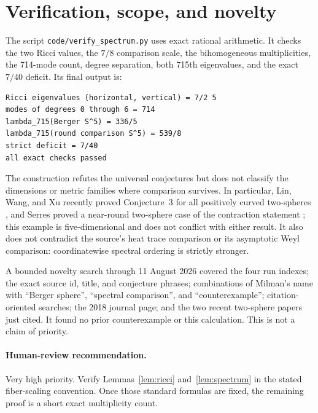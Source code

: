 \documentclass[10pt]{article}
\begin{document}
\section{Verification, scope, and novelty}
The script \texttt{code/verify\_spectrum.py} uses exact rational arithmetic.
It checks the two Ricci values, the $7/8$ comparison scale, the
bihomogeneous multiplicities, the 714-mode count, degree separation, both
715th eigenvalues, and the exact $7/40$ deficit.  Its final output is:
\begin{verbatim}
Ricci eigenvalues (horizontal, vertical) = 7/2 5
modes of degrees 0 through 6 = 714
lambda_715(Berger S^5) = 336/5
lambda_715(round comparison S^5) = 539/8
strict deficit = 7/40
all exact checks passed
\end{verbatim}

The construction refutes the universal conjectures but does not classify the
dimensions or metric families where comparison survives.  In particular, Lin,
Wang, and Xu recently proved Conjecture~3 for all positively curved
two-spheres \cite{LWX}, and Serres proved a near-round two-sphere case of the
contraction statement \cite{Serres}; this example is five-dimensional and does
not conflict with either result.  It also does not contradict the source's heat
trace comparison or its asymptotic Weyl comparison: coordinatewise spectral
ordering is strictly stronger.

A bounded novelty search through 11 August 2026 covered the four run indexes;
the exact source id, title, and conjecture phrases; combinations of Milman's
name with ``Berger sphere'', ``spectral comparison'', and ``counterexample'';
citation-oriented searches; the 2018 journal page; and the two recent
two-sphere papers just cited.  It found no prior counterexample or this
calculation.  This is not a claim of priority.

\paragraph{Human-review recommendation.}
Very high priority.  Verify Lemmas~\ref{lem:ricci} and~\ref{lem:spectrum} in
the stated fiber-scaling convention.  Once those standard formulas are fixed,
the remaining proof is a short exact multiplicity count.
\end{document}
